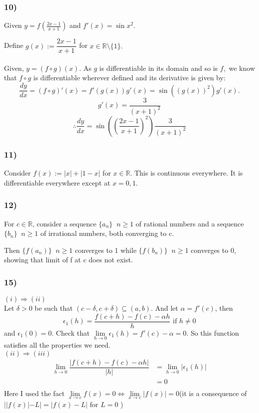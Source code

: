 \documentclass[handout]{beamer}
\begin{document}
\begin{frame}
\frametitle{10)}
Given \(y = f\left(\frac{2x-1}{x+1}\right)\) and \(f'(x) = \sin{x^{2}}\).

Define $g(x) := \dfrac{2x - 1}{x + 1}$ for $x \in \mathbb{R}\setminus\{1\}.$\\~\\
Given, $y = (f\circ g)(x).$ As $g$ is differentiable in its domain and so is $f,$ we know that $f\circ g$ is differentiable wherever defined and its derivative is given by:
\[\dfrac{dy}{dx} = (f\circ g)'(x) = f'(g(x))g'(x) = \sin\left((g(x))^2\right)g'(x).\]
\[ g'(x) = \dfrac{3}{(x+1)^2} \]
\[\therefore \dfrac{dy}{dx} = \sin\left(\left(\dfrac{2x - 1}{x+1}\right)^2\right)\dfrac{3}{(x+1)^{2}}\]

\end{frame}


\begin{frame}
    \frametitle{11)}
Consider \(f(x):= |x|+|1-x| \) for \(x \in \mathbb{R}\).
This is continuous everywhere. It is differentiable everywhere except at $x = 0,1$.
\end{frame}

\begin{frame}
    \frametitle{12)}
    For $c \in \mathbb{R}$, consider a sequence $\{a_{n}\} \; \; n \ge 1 $ of rational numbers and a sequence $\{b_{n}\} \; \; n \ge 1 $
    of irrational numbers, both converging to c. 
    
    Then $\{f (a_{n})\} \; \; n \ge 1$  converges to 1 while
    $\{f (b_{n})\} \; \; n \ge 1$ converges to 0, showing that limit of f at c does not exist.
\end{frame}


\begin{frame}
\frametitle{15)}
$(i)\Rightarrow (ii)$\\
Let $\delta>0$ be such that $(c-\delta,c+\delta) \subseteq (a,b)$. And let $\alpha =f'(c)$, then 
$$\epsilon_1(h)=\dfrac{f(c+h)-f(c)-\alpha h}{h}\text{ if }h\neq 0$$
and $\epsilon_1(0)=0$. Check that $\underset{h \to 0}{\lim}\epsilon_1(h)=f'(c)-\alpha=0$. So this function satisfies all the properties we need.\\
$(ii)\Rightarrow (iii)$\\
\begin{align*}
\underset{h \to 0}{\lim}\dfrac{|f(c+h)-f(c)-\alpha h|}{|h|}&=\underset{h \to 0}{\lim}|\epsilon_1(h)|\\
&=0\\
\end{align*}
Here I used the fact $\underset{x \to c}{\lim}f(x)=0 \Leftrightarrow\underset{x \to c}{\lim}|f(x)|=0$(it is a consequence of $||f(x)|-L|=|f(x)-L|$ for $L=0$ )
\end{frame}
\end{document}
